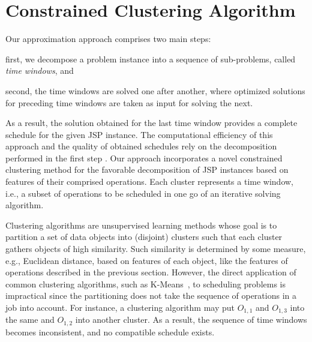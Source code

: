 \documentclass[runningheads]{llncs}
\begin{document}
\section{Constrained Clustering Algorithm}
\label{sec:method}
Our approximation approach comprises two main steps: 
\begin{enumerate*}[label=\emph{(\roman*)}]
  \item first, we decompose a problem instance into a sequence of sub-problems, called \emph{time windows}, and
  \item second, the time windows are solved one after another,
        where optimized solutions for preceding time windows are taken as input for solving the next.
\end{enumerate*}
As a result, the solution obtained for the last time window provides a complete schedule for the given JSP instance.
The computational efficiency of this approach and the quality of obtained schedules rely on the decomposition performed in the first step \cite{zhang2010hybrid,zhai2014decomposition}. 
Our approach incorporates a novel constrained clustering method for the favorable decomposition of JSP instances based on features of their comprised operations. Each cluster represents a time window, i.e., a subset of operations to be scheduled in one go of an iterative solving algorithm.

Clustering algorithms are unsupervised learning methods whose goal is to partition a set of data objects into (disjoint) clusters such that each cluster gathers objects of high similarity. 
Such similarity is determined by some measure, e.g., Euclidean distance, based on features of each object, like the features of operations described in the previous section. 
However, the direct application of common clustering algorithms, such as K-Means~\cite{Forgy1965ClusterAO}, to scheduling problems is impractical since the partitioning does not take the sequence of operations in a job into account. For instance, a clustering algorithm may put $O_{1,1}$ and $O_{1,3}$ into the same and $O_{1,2}$ into another cluster. As a result, the sequence of time windows becomes inconsistent, and no compatible schedule exists.
\end{document}
